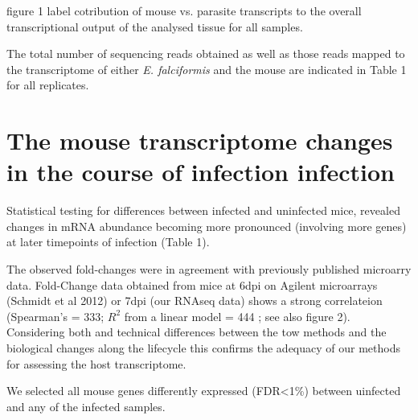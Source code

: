 \documentclass{bmcart}
\begin{document}
figure 1 label
cotribution of mouse vs. parasite transcripts to the overall
transcriptional output of the analysed tissue for all samples.

The total number of sequencing reads obtained as well as those reads
mapped to the transcriptome of either \textit{E. falciformis} and the
mouse are indicated in Table 1 for all replicates.






\section*{The mouse transcriptome changes in the course of infection infection}

Statistical testing for differences between infected and uninfected
mice, revealed changes in mRNA abundance becoming more pronounced
(involving more genes) at later timepoints of infection (Table 1).

The observed fold-changes were in agreement with previously published
microarry data. Fold-Change data obtained from mice at 6dpi on Agilent
microarrays (Schmidt et al 2012) or 7dpi (our RNAseq data) shows a
strong correlateion (Spearman's \rho = 333; $R^2$ from a linear model
= 444 ; see also figure 2). Considering both and technical differences
between the tow methods and the biological changes along the lifecycle
this confirms the adequacy of our methods for assessing the host
transcriptome.

We selected all mouse genes differently expressed (FDR<1\%) between
uinfected and any of the infected samples.



\end{document}
